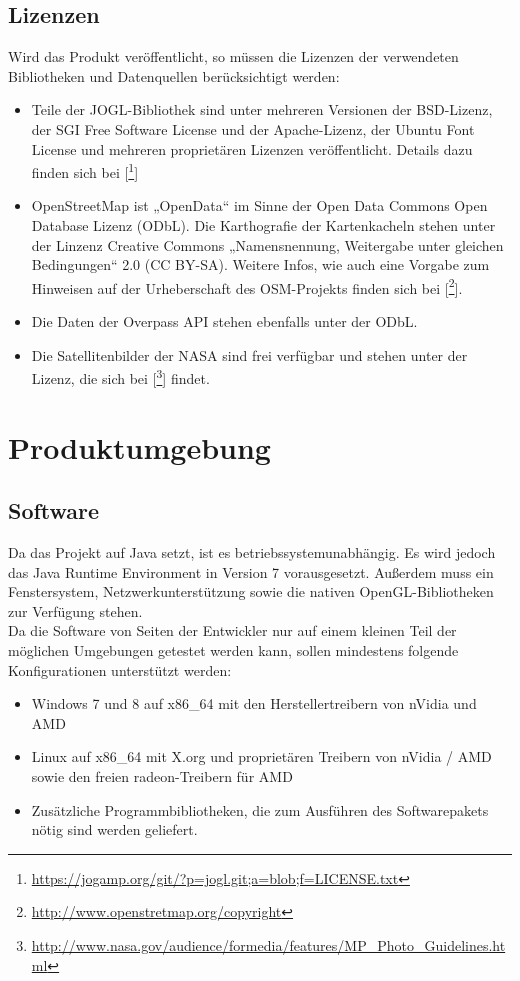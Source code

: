 \documentclass[10pt]{scrreprt}
\begin{document}
\section{Lizenzen}
Wird das Produkt veröffentlicht, so müssen die Lizenzen der verwendeten Bibliotheken und Datenquellen berücksichtigt werden:
\begin{itemize}
\item Teile der JOGL-Bibliothek sind unter mehreren Versionen der BSD-Lizenz, der SGI Free Software License und der Apache-Lizenz, der Ubuntu Font License und mehreren proprietären Lizenzen veröffentlicht. Details dazu finden sich bei [\footnote{\url{https://jogamp.org/git/?p=jogl.git;a=blob;f=LICENSE.txt}}]
\item OpenStreetMap ist „OpenData“ im Sinne der Open Data Commons Open Database Lizenz (ODbL). Die Karthografie der Kartenkacheln stehen unter der Linzenz  Creative Commons „Namensnennung, Weitergabe unter gleichen Bedingungen“ 2.0 (CC BY-SA). Weitere Infos, wie auch eine Vorgabe zum Hinweisen auf der Urheberschaft des OSM-Projekts finden sich bei [\footnote{\url{http://www.openstretmap.org/copyright}}].
\item Die Daten der Overpass API stehen ebenfalls unter der ODbL.
\item Die Satellitenbilder der NASA sind frei verfügbar und stehen unter der Lizenz, die sich bei [\footnote{\url{http://www.nasa.gov/audience/formedia/features/MP_Photo_Guidelines.html}}] findet.
\end{itemize}




\chapter{Produktumgebung}
\section{Software}
Da das Projekt auf Java setzt, ist es betriebssystemunabhängig. Es wird jedoch das Java Runtime Environment in Version 7 vorausgesetzt. Außerdem muss ein Fenstersystem, Netzwerkunterstützung sowie die nativen OpenGL-Bibliotheken zur Verfügung stehen. \\

Da die Software von Seiten der Entwickler nur auf einem kleinen Teil der möglichen Umgebungen getestet werden kann, sollen mindestens folgende Konfigurationen unterstützt werden:
\begin{itemize}
\item Windows 7 und 8 auf x86{\_}64 mit den Herstellertreibern von nVidia und AMD
\item Linux auf x86{\_}64 mit X.org und proprietären Treibern von nVidia / AMD sowie den freien radeon-Treibern für AMD
\item Zusätzliche Programmbibliotheken, die zum Ausführen des Softwarepakets nötig sind werden geliefert.
\end{itemize}
\end{document}
